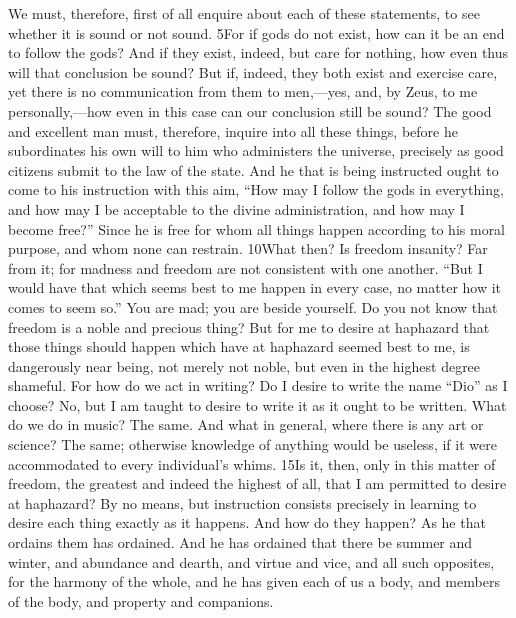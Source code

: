 We must, therefore, first of all enquire about each of these statements, to see whether it is sound or not sound. 5For if gods do not exist, how can it be an end to follow the gods? And if they exist, indeed, but care for nothing, how even thus will that conclusion be sound? But if, indeed, they both exist and exercise care, yet there is no communication from them to men,—yes, and, by Zeus, to me personally,—how even in this case can our conclusion still be sound? The good and excellent man must, therefore, inquire into all these things, before he subordinates his own will to him who administers the universe, precisely as good citizens submit to the law of the state. And he that is being instructed ought to come to his instruction with this aim, ``How may I follow the gods in everything, and how may I be acceptable to the divine administration, and how may I become free?'' Since he is free for whom all things happen according to his moral purpose, and whom none can restrain. 10What then? Is freedom insanity? Far from it; for madness and freedom are not consistent with one another. ``But I would have that which seems best to me happen in every case, no matter how it comes to seem so.'' You are mad; you are beside yourself. Do you not know that freedom is a noble and precious thing? But for me to desire at haphazard that those things should happen which have at haphazard seemed best to me, is dangerously near being, not merely not noble, but even in the highest degree shameful. For how do we act in writing? Do I desire to write the name ``Dio'' as I choose? No, but I am taught to desire to write it as it ought to be written. What do we do in music? The same. And what in general, where there is any art or science? The same; otherwise knowledge of anything would be useless, if it were accommodated to every individual's whims. 15Is it, then, only in this matter of freedom, the greatest and indeed the highest of all, that I am permitted to desire at haphazard? By no means, but instruction consists precisely in learning to desire each thing exactly as it happens. And how do they happen? As he that ordains them has ordained. And he has ordained that there be summer and winter, and abundance and dearth, and virtue and vice, and all such opposites, for the harmony of the whole, and he has given each of us a body, and members of the body, and property and companions.

